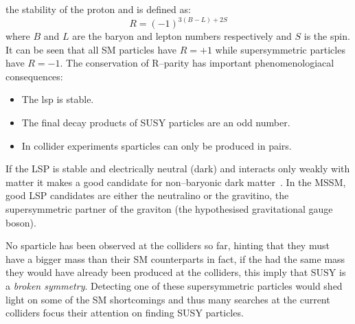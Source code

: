 the stability of the proton and is defined as:
\begin{equation}
  \label{eq:91}
  R = (-1)^{3(B - L) + 2S}
\end{equation}
where $B$ and $L$ are the baryon and lepton numbers respectively and $S$ is the
spin. It can be seen that all SM particles have $R = + 1$ while supersymmetric
particles have $R = -1$. The conservation of R--parity has important
phenomenologiacal consequences:
\begin{itemize}
\item The \gls{lsp} is stable.
\item The final decay products of SUSY particles are an odd number.
\item In collider experiments sparticles can only be produced in pairs.
\end{itemize}
If the LSP is stable and electrically neutral (dark) and interacts only weakly
with matter it makes a good candidate for non--baryonic dark
matter~\cite{WIMPS}. In the MSSM, good LSP candidates are either the neutralino
or the gravitino, the supersymmetric partner of the graviton (the hypothesised
gravitational gauge boson).

No sparticle has been observed at the colliders so far, hinting that they must
have a bigger mass than their SM counterparts in fact, if the had the same mass
they would have already been produced at the colliders, this imply that SUSY is
a \emph{broken symmetry}. Detecting one of these supersymmetric particles would
shed light on some of the SM shortcomings and thus many searches at the current
colliders focus their attention on finding SUSY particles.
